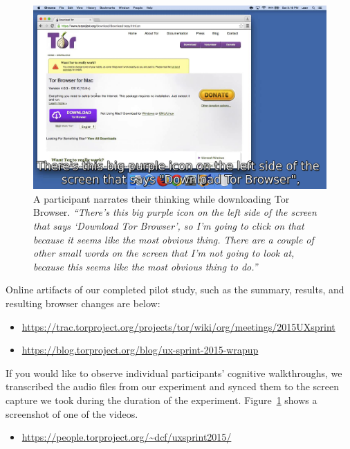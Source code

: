 \documentclass[letterpaper,twocolumn,11pt]{article}
\begin{document}
\begin{figure}
\includegraphics[width=\linewidth]{walkthrough.png}
\caption{
A participant narrates their thinking
while downloading Tor Browser.
{
\it
``There's this big purple icon on the left side of the screen that says `Download Tor Browser',
so I'm going to click on that because it seems like the most obvious thing.
There are a couple of other small words on the screen that I'm not going to look at, because this seems like the most obvious thing to do.''
}
}
\label{walkthrough}
\end{figure}

\indent \indent  Online artifacts of our completed pilot study, such as 
the summary, results, and resulting browser changes are below:
\begin{itemize} \itemsep1pt \parskip0pt 
\item \url{https://trac.torproject.org/projects/tor/wiki/org/meetings/2015UXsprint}
\item \url{https://blog.torproject.org/blog/ux-sprint-2015-wrapup}
\end{itemize}

\indent \indent If you would like to observe individual participants' cognitive walkthroughs, 
we transcribed the audio files from our experiment
and synced them to the screen capture we took during the duration of the experiment.
Figure~\ref{walkthrough} shows a screenshot of one of the videos.
\begin{itemize} \itemsep1pt \parskip0pt 
\item \url{https://people.torproject.org/~dcf/uxsprint2015/}
\end{itemize}
\end{document}
